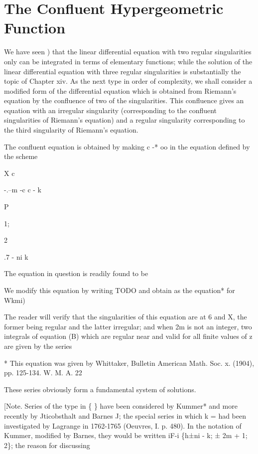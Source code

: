 %
%
\chapter{The Confluent Hypergeometric Function}


We have seen ) that the linear differential equation with two
regular singularities only can be integrated in terms of elementary
functions; while the solution of the linear differential equation
with three regular singularities is substantially the topic of Chapter
xiv. As the next type in order of complexity, we shall consider a
modified form of the differential equation which is obtained from
Riemann's equation by the confluence of two of the singularities. This
confluence gives an equation with an irregular singularity
(corresponding to the confluent singularities of Riemann's equation)
and a regular singularity corresponding to the third singularity of
Riemann's equation.

The confluent equation is obtained by making c -* oo in the equation
defined by the scheme

X c

-.--m -c c - k

P

1;

2

.7 - ni k

The equation in question is readily found to be

We modify this equation by writing TODO and obtain as the equation*
for Wkmi)

The reader will verify that the singularities of this equation are at
6 and X, the former being regular and the latter irregular; and when
2m is not an integer, two integrals of equation (B) which are regular
near and valid for all finite values of z are given by the series

* This equation was given by Whittaker, Bulletin American Math. Soc.
x. (1904), pp. 125-134. W. M. A. 22

%
%

These series obviously form a fundamental system of solutions.

[Note. Series of the type in \{ \} have been considered by Kummer* and
more recently by Jticobsthalt and Barnes J; the special series in
which k = had been investigated by Lagrange in 1762-1765 (Oeuvres, I.
p. 480). In the notation of Kummer, modified by Barnes, they would be
written iF-i \{h±ni - k; ± 2m + 1; 2\}; the reason for discussing

